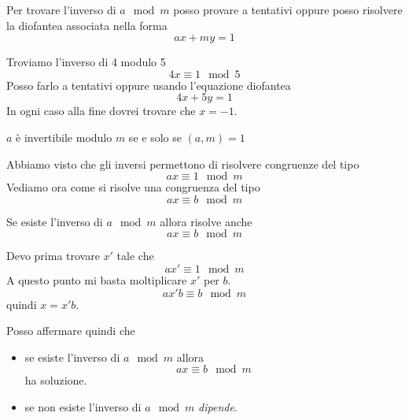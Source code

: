 Per trovare l'inverso di $a \mod{m}$ posso provare a tentativi oppure posso risolvere la
diofantea associata nella forma
\begin{equation*}
	ax + my = 1
\end{equation*}

\begin{example}
	Troviamo l'inverso di 4 modulo 5
	\begin{equation*}
		4x \equiv 1 \mod{5}
	\end{equation*}
	Posso farlo a tentativi oppure usando l'equazione diofantea
	\begin{equation*}
		4x + 5y = 1
	\end{equation*}
	In ogni caso alla fine dovrei trovare che $x = -1$.
\end{example}

\begin{theorem}
	$a$ \`e invertibile modulo $m$ se e solo se $(a, m) = 1$
\end{theorem}

Abbiamo visto che gli inversi permettono di risolvere congruenze del tipo
\begin{equation*}
	ax \equiv 1 \mod{m}
\end{equation*}
Vediamo ora come si risolve una congruenza del tipo
\begin{equation*}
	ax \equiv b \mod{m}
\end{equation*}

\begin{proposition}
	Se esiste l'inverso di $a \mod{m}$ allora risolve anche
	\begin{equation*}
		ax \equiv b \mod{m}
	\end{equation*}
\end{proposition}

Devo prima trovare $x'$ tale che
\begin{equation*}
	ax' \equiv 1 \mod{m}
\end{equation*}
A questo punto mi basta moltiplicare $x'$ per $b$.
\begin{equation*}
	ax'b \equiv b \mod{m}
\end{equation*}
quindi $x = x'b$.

Posso affermare quindi che
\begin{itemize}
	\item se esiste l'inverso di $a \mod{m}$ allora
	      \begin{equation*}
		      ax \equiv b \mod{m}
	      \end{equation*}
	      ha soluzione.
	\item se non esiste l'inverso di $a \mod{m}$ \emph{dipende}.
\end{itemize}

